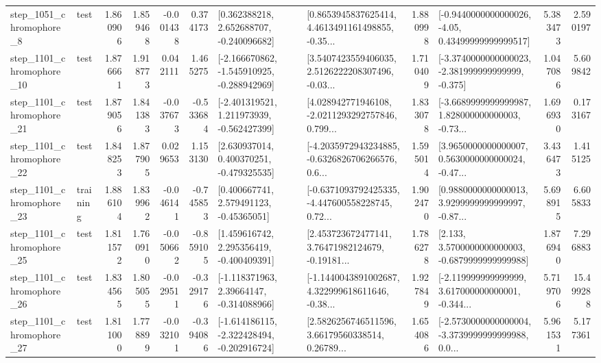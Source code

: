 \begin{tabular}{llrrrrllrlrr}
  step\_1051\_chromophore\_8 &      test &      1.860906 &    1.859468 &     -0.001438 &  0.374173 &    [0.362388218, 2.652688707, -0.240096682] &  [0.8653945837625414, 4.4613491161498855, -0.35... &       1.880998 &  [-0.9440000000000026, -4.05, 0.43499999999999517] &            5.383473 &          2.590197 \\
 step\_1101\_chromophore\_10 &      test &      1.876661 &    1.918773 &      0.042111 &  1.465275 &  [-2.166670862, -1.545910925, -0.288942969] &  [3.5407423559406035, 2.5126222208307496, -0.03... &       1.710409 &  [-3.3740000000000023, -2.381999999999999, -0.375] &            1.047086 &          5.609842 \\
 step\_1101\_chromophore\_21 &      test &      1.879056 &    1.841383 &     -0.037673 & -0.533684 &   [-2.401319521, 1.211973939, -0.562427399] &  [4.028942771946108, -2.0211293292757846, 0.799... &       1.833078 &  [-3.6689999999999987, 1.828000000000003, -0.73... &            1.696930 &          0.173167 \\
 step\_1101\_chromophore\_22 &      test &      1.848253 &    1.877905 &      0.029653 &  1.153130 &    [2.630937014, 0.400370251, -0.479325535] &  [-4.2035972943234885, -0.6326826706266576, 0.6... &       1.595014 &  [3.9650000000000007, 0.5630000000000024, -0.47... &            3.436473 &          1.415125 \\
 step\_1101\_chromophore\_23 &  training &      1.886104 &    1.839962 &     -0.046141 & -0.745853 &     [0.400667741, 2.579491123, -0.45365051] &  [-0.6371093792425335, -4.447600558228745, 0.72... &       1.902470 &  [0.9880000000000013, 3.9299999999999997, -0.87... &            5.698915 &          6.605833 \\
 step\_1101\_chromophore\_25 &      test &      1.811572 &    1.760910 &     -0.050662 & -0.859105 &    [1.459616742, 2.295356419, -0.400409391] &  [2.453723672477141, 3.76471982124679, -0.19181... &       1.786278 &   [2.133, 3.5700000000000003, -0.6879999999999988] &            1.876940 &          7.296883 \\
 step\_1101\_chromophore\_26 &      test &      1.834565 &    1.805055 &     -0.029511 & -0.329176 &    [-1.118371963, 2.39664147, -0.314088966] &  [-1.1440043891002687, 4.322999618611646, -0.38... &       1.927849 &  [-2.119999999999999, 3.617000000000001, -0.344... &            5.719706 &         15.499288 \\
 step\_1101\_chromophore\_27 &      test &      1.811000 &    1.778899 &     -0.032101 & -0.394086 &  [-1.614186115, -2.322428494, -0.202916724] &  [2.5826256746511596, 3.66179560338514, 0.26789... &       1.654086 &  [-2.5730000000000004, -3.3739999999999988, 0.0... &            5.961531 &          5.177361 \\

\end{tabular}
